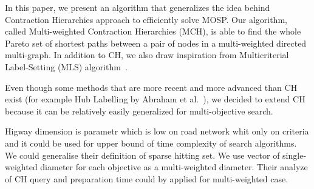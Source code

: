 
In this paper, we present an algorithm that generalizes the idea behind Contraction
Hierarchies approach to efficiently solve MOSP. Our algorithm, called
Multi-weighted Contraction Hierarchies (MCH), is able to find the whole Pareto
set of shortest paths between a pair of nodes in a multi-weighted directed
multi-graph. In addition to CH, we also draw inspiration from Multicriterial
Label-Setting (MLS) algorithm~\cite{martins1984multicriteria}. 

Even though some methods that are more recent and more advanced than CH exist (for example Hub Labelling by Abraham et al.~\cite{abraham2011hub}), we decided to extend CH because it can be relatively easily generalized for multi-objective search. 




Higway dimension  \cite{abraham2016highway} is parametr which is low on road
network whit only on criteria and it could be used for upper bound of time
complexity of search algorithms. We could generalise their definition of 
sparse hitting set. We use vector of single-weighted diameter for each objective
as a multi-weighted diameter. Their analyze of CH query and preparation time
could by applied for multi-weighted case.




